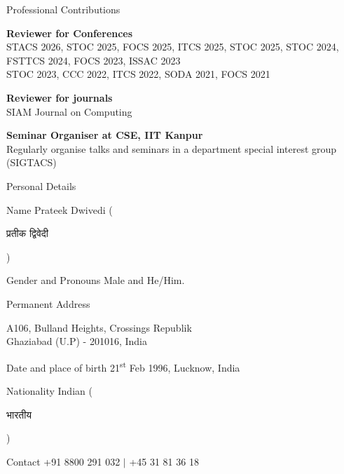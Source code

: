\documentclass{resume} %
\begin{document}
\begin{rSection}{Professional Contributions}
  \item \textbf{Reviewer for Conferences}\\
  {STACS 2026, STOC 2025, FOCS 2025, ITCS 2025, STOC 2025, STOC 2024, FSTTCS 2024, FOCS 2023, ISSAC 2023}\\
  {STOC 2023, CCC 2022, ITCS 2022, SODA 2021, FOCS 2021}

  \item \textbf{Reviewer for journals}\\
  {SIAM Journal on Computing}\\

  \item \textbf{Seminar Organiser at CSE, IIT Kanpur}\\
  {Regularly organise talks and seminars in a department special interest group (SIGTACS)}
\end{rSection}


\begin{rSection}{Personal Details}

  \item Name \hfill Prateek Dwivedi (\begin{hindi}{प्रतीक द्विवेदी}\end{hindi})
  \item Gender and Pronouns \hfill Male and He/Him.
  \item \begin{minipage}[t]{0.4\linewidth} Permanent Address \end{minipage} \hfill \begin{minipage}[t]{0.50\linewidth}
    \begin{flushright}
      A106, Bulland Heights, Crossings Republik\\ Ghaziabad (U.P) - 201016, India
    \end{flushright}
  \end{minipage}
  \item Date and place of birth \hfill 21\textsuperscript{st} Feb 1996, Lucknow, India
  \item Nationality \hfill Indian (\begin{hindi}{भारतीय}\end{hindi})
  \item Contact \hfill +91 8800 291 032 \(|\) +45 31 81 36 18
\end{rSection}
\end{document}
